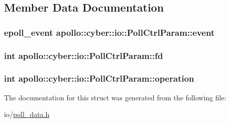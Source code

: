 \subsection{Member Data Documentation}
\hypertarget{structapollo_1_1cyber_1_1io_1_1PollCtrlParam_ae485376eff2473d06a683c13681ec42d}{
\subsubsection[{event}]{\setlength{\rightskip}{0pt plus 5cm}epoll\-\_\-event apollo\-::cyber\-::io\-::\-Poll\-Ctrl\-Param\-::event}}\label{structapollo_1_1cyber_1_1io_1_1PollCtrlParam_ae485376eff2473d06a683c13681ec42d}
\hypertarget{structapollo_1_1cyber_1_1io_1_1PollCtrlParam_a4cd35fd6797c3681f1267dc1f1dfd603}{
\subsubsection[{fd}]{\setlength{\rightskip}{0pt plus 5cm}int apollo\-::cyber\-::io\-::\-Poll\-Ctrl\-Param\-::fd}}\label{structapollo_1_1cyber_1_1io_1_1PollCtrlParam_a4cd35fd6797c3681f1267dc1f1dfd603}
\hypertarget{structapollo_1_1cyber_1_1io_1_1PollCtrlParam_acf526d6e0c32d68dca0b34e22f41afd2}{
\subsubsection[{operation}]{\setlength{\rightskip}{0pt plus 5cm}int apollo\-::cyber\-::io\-::\-Poll\-Ctrl\-Param\-::operation}}\label{structapollo_1_1cyber_1_1io_1_1PollCtrlParam_acf526d6e0c32d68dca0b34e22f41afd2}


The documentation for this struct was generated from the following file\-:\begin{DoxyCompactItemize}
\item 
io/\hyperlink{poll__data_8h}{poll\-\_\-data.\-h}\end{DoxyCompactItemize}
